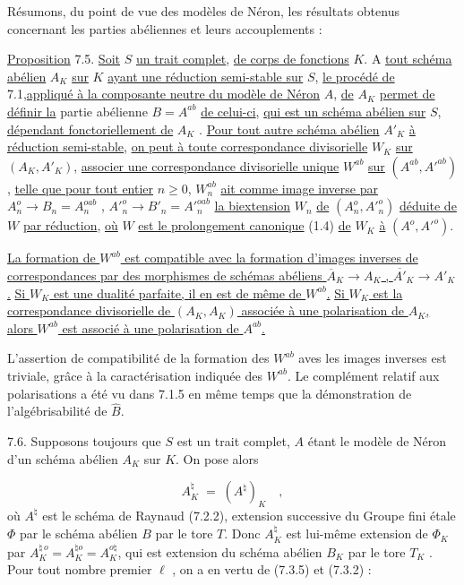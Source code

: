 Résumons, du point de vue des modèles de Néron, les résultats obtenus concernant les parties abéliennes et leurs accouplements :

\underline{Proposition} 7.5. \underline{Soit} $S$ \underline{un trait complet}, \underline{de corps de fonctions} $K$. A \underline{tout schéma abélien} $A_K$ \underline{sur} $K$ \underline{ayant une réduction semi-stable sur} $S$, \underline{le procédé de} 7.1,\underline{appliqué à la composante neutre du modèle de Néron} $A$, \underline{de} $A_K$ \underline{permet de définir la} partie abélienne $B = A^{ab}$ \underline{de celui-ci}, \underline{qui est un schéma abélien sur} $S$, \underline{dépendant fonctoriellement de} $A_K$ . \underline{Pour tout autre schéma abélien} $A'_K$ \underline{à réduction semi-stable}, \underline{on peut à toute correspondance divisorielle} $W_K$ \underline{sur} $(A_K,A'_K)$, \underline{associer une correspondance divisorielle unique} $W^{ab}$ \underline{sur} $(A^{ab},{A'}^{ab})$, \underline{telle que pour tout entier} $n \geq 0$, $W_n^{ab}$ \underline{ait comme image inverse par} $A_n^o \longrightarrow B_n = A_n^{oab}$ , ${A'}^{o}_{n} \longrightarrow B'_n = {A'}^{oab}_{n}$ \underline{la biextension} $W_n$ \underline{de} $(A_n^o,{A'}^{o}_{n})$ \underline{déduite de} $W$ \underline{par réduction}, \underline{où} $W$ \underline{est le prolongement canonique} (1.4) \underline{de} $W_K$ \underline{à} $(A^o,{A'}^{o})$.



\underline{La formation de $W^{ab}$ est compatible avec la formation d'images inverses de correspondances par des morphismes de schémas abéliens $\overline{A}_K \longrightarrow A_K$ , $\overline{A'}_K \longrightarrow A'_K$ .} \underline{Si $W_K$ est une dualité parfaite, il en est de même de $W^{ab}$.} \underline{Si $W_K$ est la correspondance divisorielle de $(A_K,A_K)$ associée à une polarisation de $A_K$, alors $W^{ab}$ est associé à une polarisation de $A^{ab}$.}

L'assertion de compatibilité de la formation des $W^{ab}$ aves les images inverses est triviale, grâce à la caractérisation indiquée des $W^{ab}$. Le complément relatif aux polarisations a été vu dans 7.1.5 en même temps que la démonstration de l'algébrisabilité de $\hat{B}$.

7.6. Supposons toujours que $S$ est un trait complet, $A$ étant le modèle de Néron d'un schéma abélien $A_K$ sur $K$. On pose alors

\begin{equation}\tag{7.6.1}
A_K^{\natural} \;=\; (A^{\natural})_K \quad ,
\end{equation}
où $A^{\natural}$ est le schéma de Raynaud (7.2.2), extension successive du Groupe fini étale $\Phi$ par le schéma abélien $B$ par le tore $T$. Donc $A_K^{\natural}$ est lui-même extension de $\Phi_K$ par $A_K^{\natural\,o} = A^{\natural o}_K = A^{o\natural}_K$, qui est extension du schéma abélien $B_K$ par le tore $T_K$ . Pour tout nombre premier $\ell$ , on a en vertu de (7.3.5) et (7.3.2) :

